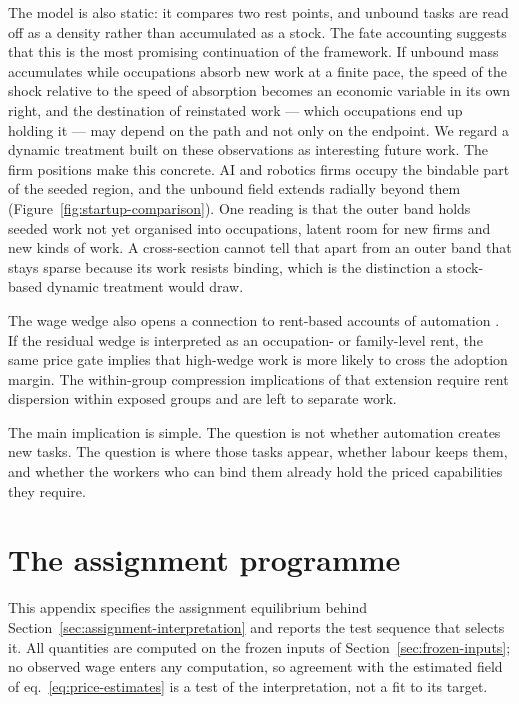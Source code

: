 \documentclass[12pt, a4paper]{article}
\begin{document}
The model is also static: it compares two rest points, and unbound
tasks are read off as a density rather than accumulated as a stock.
The fate accounting suggests that this is the most promising
continuation of the framework. If unbound mass accumulates while
occupations absorb new work at a finite pace, the speed of the shock
relative to the speed of absorption becomes an economic variable in
its own right, and the destination of reinstated work --- which
occupations end up holding it --- may depend on the path and not only
on the endpoint. We regard a dynamic treatment built on these
observations as interesting future work. The firm positions make this
concrete. AI and robotics firms occupy the bindable part of the seeded
region, and the unbound field extends radially beyond them
(Figure~\ref{fig:startup-comparison}). One reading is that the outer
band holds seeded work not yet organised into occupations, latent room
for new firms and new kinds of work. A cross-section cannot tell that
apart from an outer band that stays sparse because its work resists
binding, which is the distinction a stock-based dynamic treatment would
draw.

The wage wedge also opens a connection to rent-based accounts of
automation \parencite{acemoglu2024rents}. If the residual wedge is interpreted as an occupation- or
family-level rent, the same price gate implies that high-wedge work is
more likely to cross the adoption margin. The within-group compression
implications of that extension require rent dispersion within exposed
groups and are left to separate work.

The main implication is simple. The question is not whether automation
creates new tasks. The question is where those tasks appear, whether
labour keeps them, and whether the workers who can bind them already
hold the priced capabilities they require.

\appendix

\section{The assignment programme}
\label{app:assignment}

This appendix specifies the assignment equilibrium behind
Section~\ref{sec:assignment-interpretation} and reports the test
sequence that selects it. All quantities are computed on the frozen
inputs of Section~\ref{sec:frozen-inputs}; no observed wage enters any
computation, so agreement with the estimated field of
eq.~\eqref{eq:price-estimates} is a test of the interpretation, not a
fit to its target.
\end{document}
